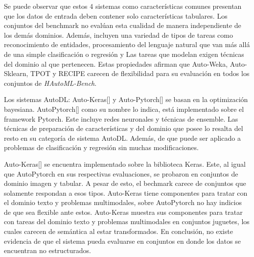Se puede observar que estos 4 sistemas como características comunes presentan que los datos de entrada deben contener solo características tabulares.
Los conjuntos del benchmark no evalúan esta cualidad de manera independiente de los demás dominios. Además, incluyen una variedad de tipos de tareas como 
reconocimiento de entidades, procesamiento del lenguaje natural que van más allá de una simple clasificación o regresión y Las tareas que modelan 
exigen técnicas del dominio al que pertenecen. Estas propiedades afirman que Auto-Weka, Auto-Sklearn, TPOT y RECIPE carecen de flexibilidad para 
su evaluación en todos los conjuntos de \textit{HAutoML-Bench}.

Los sistemas AutoDL: Auto-Keras[\cite{13}] y Auto-Pytorch[\cite{21}] se basan en la optimización bayesiana. 
AutoPytorch[\cite{21}] como su nombre lo indica, está implementado sobre el framework Pytorch. Este incluye redes neuronales y técnicas de ensemble. 
Las técnicas de preparación de características y del dominio que posee lo resalta del resto en su categoría de sistema AutoDL. Además, de que puede ser aplicado a 
problemas de clasificación y regresión sin muchas modificaciones.

Auto-Keras[\cite{13}] se encuentra implementado sobre la biblioteca Keras. Este, al igual que AutoPytorch en sus respectivas evaluaciones, 
se probaron en conjuntos de dominio imagen y tabular. A pesar de esto, el bechmark carece de conjuntos que solamente respondan a esos tipos. 
Auto-Keras tiene componentes para tratar con el dominio texto y problemas multimodales, sobre AutoPytorch no hay indicios de que sea flexible 
ante estos. 
Auto-Keras muestra sus componentes para tratar con tareas del dominio texto y problemas multimodales en conjuntos juguetes, los cuales carecen de 
semántica al estar transformados. En conclusión, no existe evidencia de que el sistema pueda evaluarse en conjuntos en donde los datos se encuentran no estructurados. 


